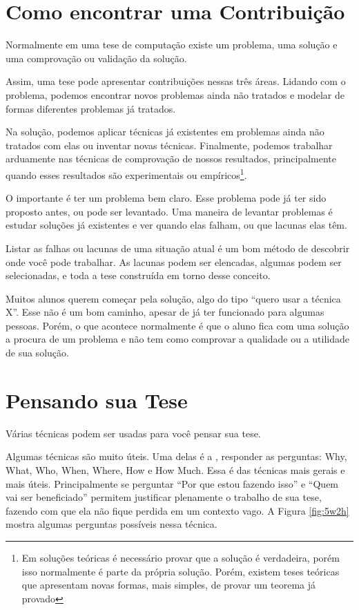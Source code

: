 \section{Como encontrar uma Contribuição}

Normalmente em uma tese de computação existe um problema, uma solução e uma comprovação ou validação da solução.

Assim, uma tese pode apresentar contribuições nessas três áreas. Lidando com o problema, podemos encontrar novos problemas ainda não tratados e modelar de formas diferentes problemas já tratados.

Na solução, podemos aplicar técnicas já existentes em problemas ainda não tratados com elas ou inventar novas técnicas. Finalmente, podemos trabalhar arduamente nas técnicas de comprovação de nossos resultados, principalmente quando esses resultados são experimentais ou empíricos\footnote{Em soluções teóricas é necessário provar que a solução é verdadeira, porém isso normalmente é parte da própria solução. Porém, existem teses teóricas que apresentam novas formas, mais simples, de provar um teorema já provado}.

O importante é ter um problema bem claro. Esse problema pode já ter sido proposto antes, ou pode ser levantado. Uma maneira de levantar problemas é estudar soluções já existentes e ver quando elas falham, ou que lacunas elas têm.

Listar as falhas ou lacunas de uma situação atual é um bom método de descobrir onde você pode trabalhar. As lacunas podem ser elencadas, algumas podem ser selecionadas, e toda a tese construída em torno desse conceito.

Muitos alunos querem começar pela solução, algo do tipo “quero usar a técnica X”. Esse não é um bom caminho, apesar de já ter funcionado para algumas pessoas. Porém, o que acontece normalmente é que o aluno fica com uma solução a procura de um problema e não tem como comprovar a qualidade ou a utilidade de sua solução.


\section{Pensando sua Tese}

Várias técnicas podem ser usadas para você pensar sua tese.

Algumas técnicas são muito úteis. Uma delas é a , responder as perguntas: Why, What, Who, When, Where, How e How Much. Essa é das técnicas mais gerais e mais úteis. Principalmente se perguntar “Por que estou fazendo isso” e “Quem vai ser beneficiado” permitem justificar plenamente o trabalho de sua tese, fazendo com que ela não fique perdida em um contexto vago.  A Figura \ref{fig:5w2h} mostra algumas perguntas possíveis nessa técnica.

